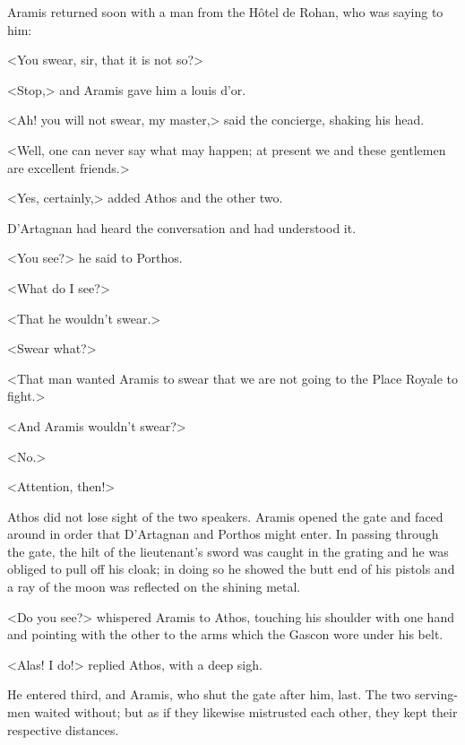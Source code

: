 Aramis returned soon with a man from the Hôtel de Rohan, who was saying to him:

<You swear, sir, that it is not so?>

<Stop,> and Aramis gave him a louis d'or.

<Ah! you will not swear, my master,> said the concierge, shaking his head.

<Well, one can never say what may happen; at present we and these gentlemen are excellent friends.>

<Yes, certainly,> added Athos and the other two.

D'Artagnan had heard the conversation and had understood it.

<You see?> he said to Porthos.

<What do I see?>

<That he wouldn't swear.>

<Swear what?>

<That man wanted Aramis to swear that we are not going to the Place Royale to fight.>

<And Aramis wouldn't swear?>

<No.>

<Attention, then!>

Athos did not lose sight of the two speakers. Aramis opened the gate and faced around in order that D'Artagnan and Porthos might enter. In passing through the gate, the hilt of the lieutenant's sword was caught in the grating and he was obliged to pull off his cloak; in doing so he showed the butt end of his pistols and a ray of the moon was reflected on the shining metal.

<Do you see?> whispered Aramis to Athos, touching his shoulder with one hand and pointing with the other to the arms which the Gascon wore under his belt.

<Alas! I do!> replied Athos, with a deep sigh.

He entered third, and Aramis, who shut the gate after him, last. The two serving-men waited without; but as if they likewise mistrusted each other, they kept their respective distances. 